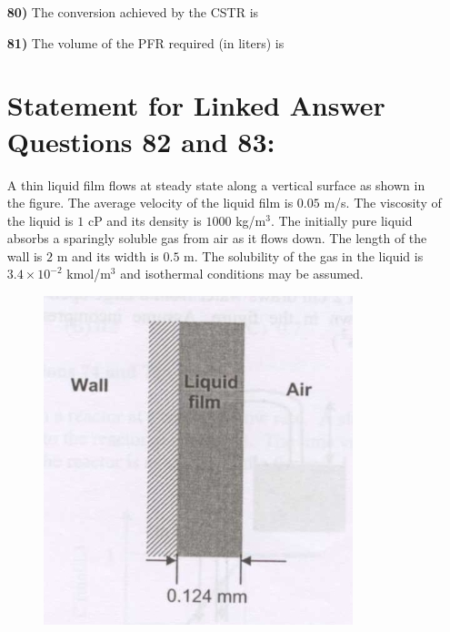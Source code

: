 \documentclass[journal,12pt,onecolumn]{IEEEtran}
\theoremstyle{remark}
\begin{document}
\begin{enumerate}
\begin{enumerate}
    \item[\textbf{80)}] The conversion achieved by the CSTR is
    \hfill{}
    \begin{enumerate}
    \end{enumerate}
    \item[\textbf{81)}] The volume of the PFR required (in liters) is
    \hfill{}
    \begin{enumerate}
    \end{enumerate}
    \section*{Statement for Linked Answer Questions 82 and 83:}
A thin liquid film flows at steady state along a vertical surface as shown in the figure. The average velocity of the liquid film is $0.05$ m/s. The viscosity of the liquid is $1$ cP and its density is $1000$ kg/m$^3$. The initially pure liquid absorbs a sparingly soluble gas from air as it flows down. The length of the wall is $2$ m and its width is $0.5$ m. The solubility of the gas in the liquid is $3.4 \times 10^{-2}$ kmol/m$^3$ and isothermal conditions may be assumed.

\begin{figure}[H]
    \centering
    \includegraphics[width=0.25\columnwidth]{figs/qn 82.jpg}
    \caption{}
    \label{fig:qn81.jpg}
\end{figure}


\end{enumerate}
\end{enumerate}
\end{document}
